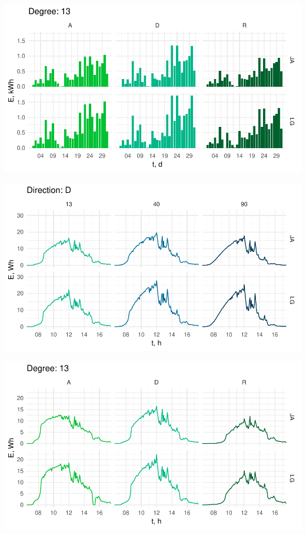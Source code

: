 \begin{center}
    \includegraphics[width=\linewidth]{figures/mar_Dirbar.pdf}
\end{center}
\begin{center}
    \includegraphics[width=\linewidth]{figures/mar_Deg_l.pdf}
\end{center}
\begin{center}
    \includegraphics[width=\linewidth]{figures/mar_Dir_l.pdf}
\end{center}
